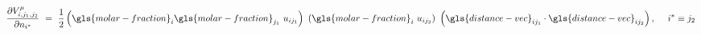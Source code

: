 \documentclass{article}
\begin{document}
\begin{equation}
    \frac{\partial V^{\mu}_{i,j_1,j_2}}{\partial n_{i^*}}\ =\ \frac{1}{2} \left(\gls{molar-fraction}_i\gls{molar-fraction}_{j_1}\ u_{ij_1}\right)\ \left(\gls{molar-fraction}_i\ u_{ij_2}\right)\ \left(\gls{distance-vec}_{ij_1} \cdot \gls{distance-vec}_{ij_2}\right),\ \quad i^{*} \equiv j_2
\end{equation}

\begin{comment}
The contribution of the dipole distortion \gls{di-distortion} to the \acrshort{adp} is given by:
\begin{align}
\label{eq:dipole-distortion-term}
&V^{\gls{di-distortion}}\ =\ \frac{1}{2} \sum_{i \in I_{Mg} \cup I_{H} } \left(\gls{di-distortion}_i \cdot \gls{di-distortion}_i \right),\quad \text{where}\\
\label{eq:dipole-distortion}
&\gls{di-distortion}_i\ =\ \sum_{\substack{j \in \mathcal{B}_i(r_\text{c}) \\ j \neq i}} \gls{molar-fraction}_i\gls{molar-fraction}_j\ u_{ij} (\| \gls{distance-vec}_{ij} \|)\ \gls{distance-vec}_{ij}  
\end{align}

Introducing \cref{eq:dipole-distortion} into \cref{eq:dipole-distortion-term} the former can be expressed as the product of two summation. After some algebra it is possible to reduce it to the summation of individual potential which depends of the atomistic information of three sites:
\begin{equation}
\label{eq:dipole-distortion-term-a}
\begin{split}
V^{\gls{di-distortion}}\ &=\ \frac{1}{2} \sum_{i \in I_{Mg} \cup I_{H} } \left( \sum_{\substack{j \in \mathcal{B}_i(r_\text{c}) \\ j \neq i}} \gls{molar-fraction}_i\gls{molar-fraction}_j\ u_{ij}\ \gls{distance-vec}_{ij} \right) \cdot \left(\sum_{\substack{k \in \mathcal{B}_i(r_\text{c}) \\ k \neq i}} \gls{molar-fraction}_i\gls{molar-fraction}_k\ u_{ik}\ \gls{distance-vec}_{ik} \right)\\
&=\ \frac{1}{2} \sum_{i \in I_{Mg} \cup I_{H} } \sum_{\substack{j,k \in \mathcal{B}_i(r_\text{c}) \\ j,k \neq i}} \gls{di-distortion}_{ij} \cdot \gls{di-distortion}_{ik}\\
&=\ \frac{1}{2} \sum_{i \in I_{Mg} \cup I_{H} } \sum_{\substack{j,k \in \mathcal{B}_i(r_\text{c}) \\ j,k \neq i}} \left(\gls{molar-fraction}_i\gls{molar-fraction}_j\ u_{ij}\right)\ \left(\gls{molar-fraction}_i\gls{molar-fraction}_k\ u_{ik}\right)\ \left(\gls{distance-vec}_{ij} \cdot \gls{distance-vec}_{ik}\right)
\end{split}
\end{equation}


\end{comment}
\end{document}
